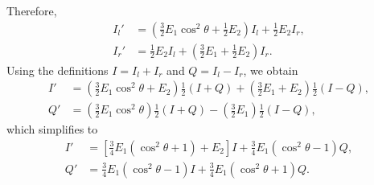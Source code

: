 \documentclass[english,a4paper]{kiseon_memo}
\begin{document}
Therefore,
\begin{align*}
I_{l}' & =\left(\tfrac{3}{2}E_{1}\cos^{2}\theta+\tfrac{1}{2}E_{2}\right)I_{l}+\tfrac{1}{2}E_{2}I_{r},\\
I_{r}' & =\tfrac{1}{2}E_{2}I_{l}+\left(\tfrac{3}{2}E_{1}+\tfrac{1}{2}E_{2}\right)I_{r}.
\end{align*}
Using the definitions $I = I_{l}+I_{r}$ and $Q = I_{l}-I_{r}$, we
obtain
\begin{align*}
I' & =\left(\tfrac{3}{2}E_{1}\cos^{2}\theta+E_{2}\right)\tfrac{1}{2}\!\left(I+Q\right)+\left(\tfrac{3}{2}E_{1}+E_{2}\right)\tfrac{1}{2}\!\left(I-Q\right),\\
Q' & =\left(\tfrac{3}{2}E_{1}\cos^{2}\theta\right)\tfrac{1}{2}\!\left(I+Q\right)-\left(\tfrac{3}{2}E_{1}\right)\tfrac{1}{2}\!\left(I-Q\right),
\end{align*}
which simplifies to
\begin{align*}
I' & =\left[\tfrac{3}{4}E_{1}\!\left(\cos^{2}\theta+1\right)+E_{2}\right]I+\tfrac{3}{4}E_{1}\!\left(\cos^{2}\theta-1\right)Q,\\
Q' & =\tfrac{3}{4}E_{1}\!\left(\cos^{2}\theta-1\right)I+\tfrac{3}{4}E_{1}\!\left(\cos^{2}\theta+1\right)Q.
\end{align*}
\end{document}
